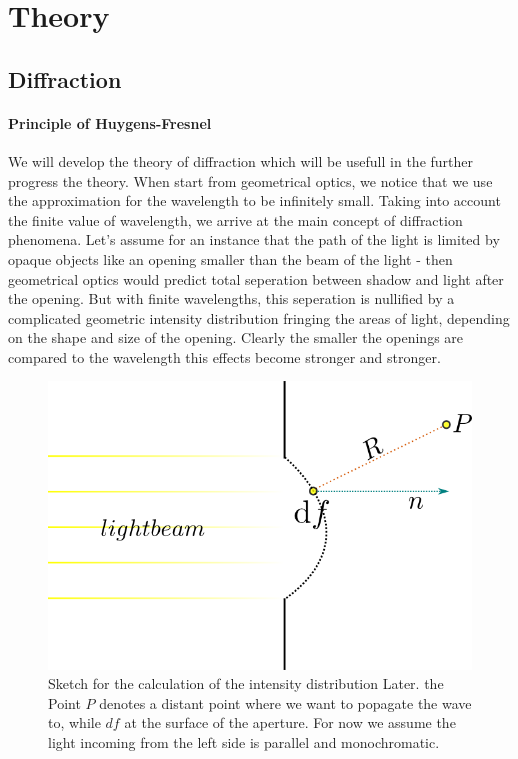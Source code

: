 \section{Theory}
\subsection{Diffraction}
\paragraph{Principle of Huygens-Fresnel}
We will develop the theory of diffraction \cite{landau2} which will be usefull in the further progress
the theory. When start from geometrical optics, we notice that we use the approximation for the 
wavelength to be infinitely small. Taking into account the finite value of wavelength, we arrive at the
main concept of diffraction phenomena. Let's assume for an instance that the path of the light is limited by
opaque objects like an opening smaller than the beam of the light - then geometrical optics would predict 
total seperation between shadow and light after the opening. But with finite wavelengths, this seperation
is nullified by a complicated geometric intensity distribution fringing the areas of light,
depending on the shape and size of the opening. Clearly the smaller the openings are compared to the
wavelength this effects become stronger and stronger.
\begin{figure}[htpb]
    \centering
    \includegraphics[width=0.5\linewidth]{figures/beam}
    \caption{Sketch for the calculation of the intensity distribution Later. the Point $P$ denotes a distant
        point where we want to popagate the wave to, while $df$ at the surface of the aperture. For now 
        we assume the light incoming from the left side is parallel and monochromatic.}
    \label{fig:beam}
\end{figure}
